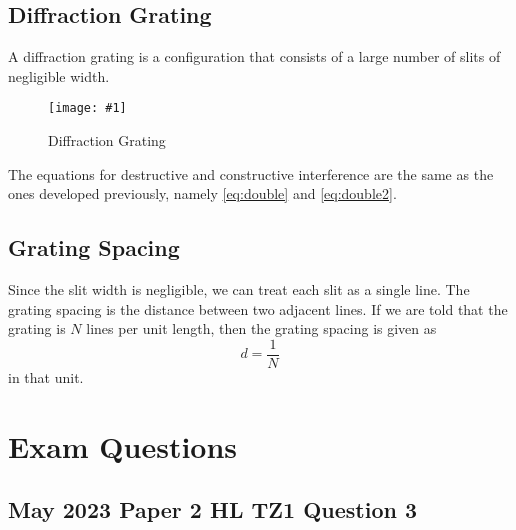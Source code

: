 \documentclass[a4paper,12pt]{article}
\let\oldsection\section
\renewcommand\section{\clearpage\oldsection}
\newcommand{\img}[4]{\begin{center}
  \begin{figure}[H]
    \centering
    \texttt{[image: \#1]}
    \caption{#3}
    \label{fig:#4}
  \end{figure}
\end{center}}
\begin{document}
\pagebreak

\subsection{Diffraction Grating}

A diffraction grating is a configuration that consists of a large number of slits of negligible width.

\img{gratingintensity.png}{0.5}{Diffraction Grating}{gratingintensity}

The equations for destructive and constructive interference are the same as the ones developed previously, namely \cref{eq:double} and \cref{eq:double2}.

\subsection{Grating Spacing}

Since the slit width is negligible, we can treat each slit as a single line. The grating spacing is the distance between two adjacent lines. If we are told that the grating is $N$ lines per unit length, then the grating spacing is given as
$$d = \frac{1}{N}$$
in that unit.

\section{Exam Questions}

\subsection{May 2023 Paper 2 HL TZ1 Question 3}
\end{document}
